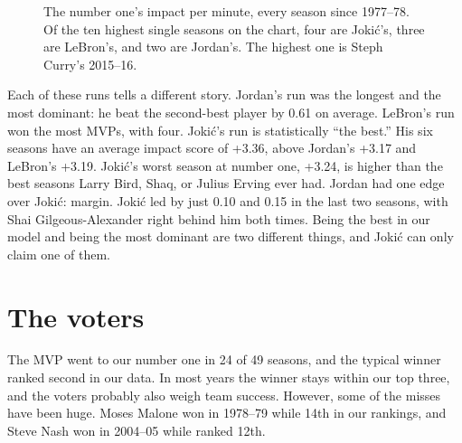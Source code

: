 \documentclass[11pt]{article}
\begin{document}
\begin{figure}[h]
\centering
{}
\caption{The number one's impact per minute, every season since 1977--78. Of the ten highest
single seasons on the chart, four are Jokić's, three are LeBron's, and two are Jordan's. The
highest one is Steph Curry's 2015--16.}
\label{fig:runs}
\end{figure}

Each of these runs tells a different story. Jordan's run was the longest and the most
dominant: he beat the second-best player by 0.61 on average. LeBron's run won the most MVPs,
with four. Jokić's run is statistically ``the best.'' His six seasons have an average impact
score of +3.36, above Jordan's +3.17 and LeBron's +3.19. Jokić's worst season at number one,
+3.24, is higher than the best seasons Larry Bird, Shaq, or Julius Erving ever had. Jordan had
one edge over Jokić: margin. Jokić led by just 0.10 and 0.15 in the last two seasons, with
Shai Gilgeous-Alexander right behind him both times. Being the best in our model and being
the most dominant are two different things, and Jokić can only claim one of them.

\section*{The voters}

The MVP went to our number one in 24 of 49 seasons, and the typical winner ranked second in
our data. In most years the winner stays within our top three, and the voters probably also
weigh team success. However, some of the misses have been huge. Moses Malone won in 1978--79
while 14th in our rankings, and Steve Nash won in 2004--05 while ranked 12th.
\end{document}

